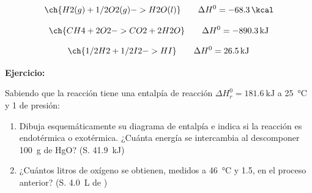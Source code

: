 \documentclass[
  spanish,
]{article}
\providecommand{\tightlist}{%
  \setlength{\itemsep}{0pt}\setlength{\parskip}{0pt}}
\begin{document}
\[\ch{H2 (g) + 1/2 O2 (g) -> H2O (l)} \qquad \Delta H^{0} = \qty{-68,3}{\kcal}\]

\hfill{}

\[\ch{CH4 + 2 O2 -> CO2 + 2 H2O} \qquad \Delta H^{0} = \qty{-890,3}{\kJ}\]

\hfill{}

\[\ch{1/2 H2 + 1/2 I2 -> HI} \qquad \Delta H^{0} = \qty{+26,5}{\kJ}\]

\textbf{Ejercicio:}

\begin{exercise}Sabiendo que la reacción
 tiene una entalpía de reacción
\(\Delta H_{r}^{0} = \qty{+181,6}{\kJ}\) a \qty{25}{\degreeCelsius} y
\qty{1}{\atm} de presión:

\begin{enumerate}
\def\labelenumi{\alph{enumi})}
\tightlist
\item
  Dibuja esquemáticamente su diagrama de entalpía e indica si la
  reacción es endotérmica o exotérmica. ¿Cuánta energía se intercambia
  al descomponer \qty{100}{\g} de HgO? (S. \qty{41,9}{\kJ})
\item
  ¿Cuántos litros de oxígeno se obtienen, medidos a
  \qty{46}{\degreeCelsius} y \qty{1,5}{\atm}, en el proceso anterior?
  (S. \qty{4,0}{\L} de )
\end{enumerate}

\end{exercise}
\end{document}
